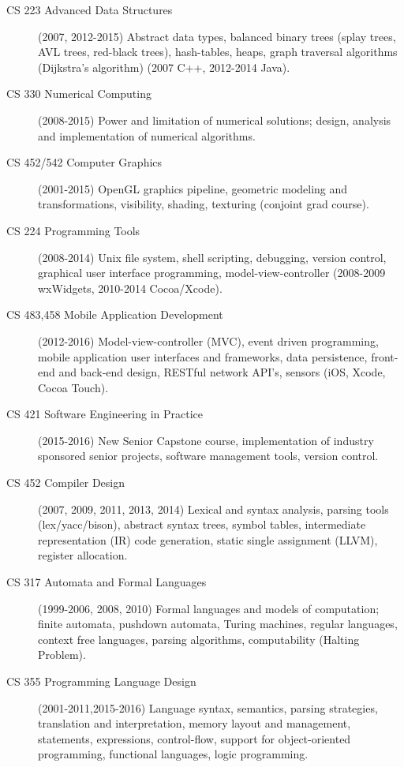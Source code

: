 \documentclass[10pt]{article}
\begin{document}
\begin{description}
  \item[CS 223 Advanced Data Structures] (2007, 2012-2015) Abstract data types, balanced binary trees (splay
     trees, AVL trees, red-black trees), hash-tables, heaps, graph traversal algorithms (Dijkstra's algorithm) 
     (2007 C++, 2012-2014 Java).
  \item[CS 330 Numerical Computing] (2008-2015) Power and limitation of numerical solutions; design, analysis 
      and implementation of numerical algorithms.
  \item[CS 452/542 Computer Graphics] (2001-2015) OpenGL %
      graphics pipeline, geometric modeling and
      transformations, visibility, shading, texturing (conjoint grad course).
  \item[CS 224 Programming Tools] (2008-2014) Unix file system, shell scripting, debugging, version control,
     graphical user interface programming, model-view-controller (2008-2009 wxWidgets, 2010-2014 Cocoa/Xcode).
  \item[CS 483,458 Mobile Application Development] (2012-2016) Model-view-controller (MVC), event driven
     programming, mobile application user interfaces and frameworks, data persistence, 
     front-end and back-end design, RESTful network API's, sensors (iOS, Xcode, Cocoa Touch).
  \item[CS 421 Software Engineering in Practice] (2015-2016) New Senior Capstone course, implementation of
     industry sponsored senior projects, software management tools, version control.
  \item[CS 452 Compiler Design] (2007, 2009, 2011, 2013, 2014) Lexical and syntax analysis, parsing tools
     (lex/yacc/bison), abstract syntax trees, symbol tables, intermediate representation (IR) code generation,
     static single assignment (LLVM), register allocation.
  \item[CS 317 Automata and Formal Languages] (1999-2006, 2008, 2010) Formal languages and 
     models of computation; finite automata, 
     pushdown automata, Turing machines, regular languages, context free languages, parsing algorithms, 
     computability (Halting Problem).
  \item[CS 355 Programming Language Design] (2001-2011,2015-2016) 
     Language syntax, semantics, parsing strategies, translation
     and interpretation, memory layout and management, statements, expressions, control-flow, support
     for object-oriented programming, functional languages, logic programming.

\end{description}
\end{document}
